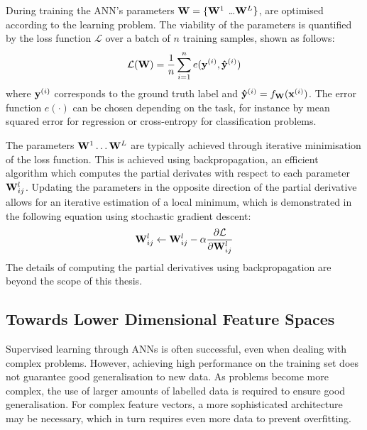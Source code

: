 		
			During training the ANN's parameters $\mathbf{W} = \{\mathbf{W}^1$ \dots $\mathbf{W}^L\}$, are optimised according to the learning problem. The viability of the parameters is quantified by the loss function $\mathcal{L}$ over a batch of $n$ training samples, shown as follows:
			$$
				\mathcal{L}(\mathbf{W}) = \frac{1}{n}\sum_{i=1}^n e(\mathbf{y}^{(i)}, \mathbf{\hat{y}}^{(i)}) \label{eq:generic_loss}
			$$
			where $\mathbf{y}^{(i)}$ corresponds to the ground truth label and $\mathbf{\hat{y}}^{(i)} = f_{\mathbf{W}}(\mathbf{x}^{(i)})$. The error function $e(\cdot)$ can be chosen depending on the task, for instance by mean squared error for regression or cross-entropy for classification problems.
			
			The parameters $\mathbf{W}^1 \dots \mathbf{W}^L$ are typically achieved through iterative minimisation of the loss function. This is achieved using backpropagation, an efficient algorithm which computes the partial derivates with respect to each parameter $\mathbf{W}^l_{ij}$. Updating the parameters in the opposite direction of the partial derivative allows for an iterative estimation of a local minimum, which is demonstrated in the following equation using stochastic gradient descent:
			$$
				\mathbf{W}^l_{ij} \leftarrow \mathbf{W}^l_{ij} - \alpha \frac{\partial \mathcal{L}}{\partial \mathbf{W}^l_{ij}}
			$$
			The details of computing the partial derivatives using backpropagation are beyond the scope of this thesis.
	
		
		\subsection{Towards Lower Dimensional Feature Spaces}
		
		Supervised learning through ANNs is often successful, even when dealing with complex problems. However, achieving high performance on the training set does not guarantee good generalisation to new data. As problems become more complex, the use of larger amounts of labelled data is required to ensure good generalisation. For complex feature vectors, a more sophisticated architecture may be necessary, which in turn requires even more data to prevent overfitting. %
		
